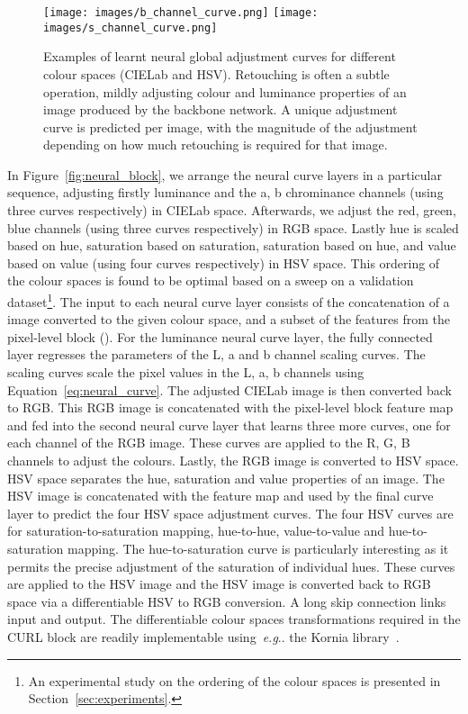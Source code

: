 \documentclass[a4paper,conference]{IEEEtran}
\makeatletter
\DeclareRobustCommand\onedot{\futurelet\@let@token\@onedot} \def\@onedot{\ifx\@let@token.\else.\null\fi\xspace}
\def\eg{\emph{e.g}\onedot} \def\Eg{\emph{E.g}\onedot}
\makeatother
\begin{document}
\begin{figure}[t!]
\begin{center}
\texttt{[image: images/b\_channel\_curve.png]}
\texttt{[image: images/s\_channel\_curve.png]}
\end{center}
\caption{Examples of learnt neural global adjustment curves for different colour spaces (CIELab and HSV). Retouching is often a subtle operation, mildly adjusting colour and luminance properties of an image produced by the backbone network. A unique adjustment curve is predicted per image, with the magnitude of the adjustment depending on how much retouching is required for that image.}
\label{fig:neural_curve_examples}
\end{figure}


In Figure~\ref{fig:neural_block}, we arrange the neural curve layers in a particular sequence, adjusting firstly luminance and the a, b chrominance channels (using three curves respectively) in CIELab space. Afterwards, we adjust the red, green, blue channels (using three curves respectively) in RGB space. Lastly hue is scaled based on hue, saturation based on saturation, saturation based on hue, and value based on value (using four curves respectively) in HSV space. This ordering of the colour spaces is found to be optimal based on a sweep on a validation dataset\footnote{An experimental study on the ordering of the colour spaces is presented in Section~\ref{sec:experiments}.}. The input to each neural curve layer consists of the concatenation of a  image converted to the given colour space, and a  subset of the features from the pixel-level block (). For the luminance neural curve layer, the fully connected layer regresses the parameters of the L, a and b channel scaling curves. The scaling curves scale the pixel values in the L, a, b channels using Equation~\ref{eq:neural_curve}. The adjusted CIELab image is then converted back to RGB. This  RGB image is concatenated with the pixel-level block  feature map and fed into the second neural curve layer that learns three more curves, one for each channel of the RGB image. These curves are applied to the R, G, B channels to adjust the colours. Lastly, the  RGB image is converted to HSV space. HSV space separates the hue, saturation and value properties of an image. The HSV image is concatenated with the  feature map and used by the final curve layer to predict the four HSV space adjustment curves. The four HSV curves are for saturation-to-saturation mapping, hue-to-hue, value-to-value and hue-to-saturation mapping. The hue-to-saturation curve is particularly interesting as it permits the precise adjustment of the saturation of individual hues. These curves are applied to the HSV image and the HSV image is converted back to RGB space via a differentiable HSV to RGB conversion. A long skip connection links input and output. The differentiable colour spaces transformations required in the CURL block are readily implementable using~\eg the Kornia library~\cite{Riba_2020_WACV}.
\end{document}
